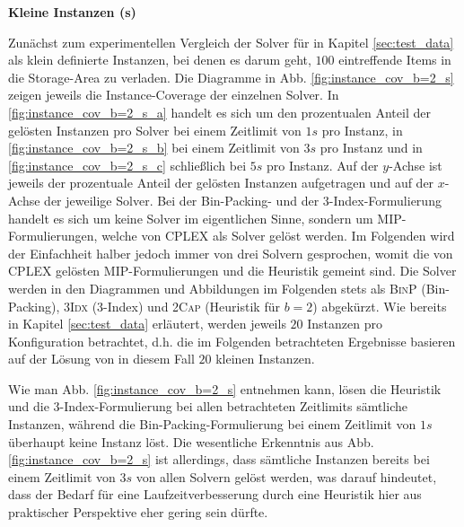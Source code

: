 \textbf{Kleine Instanzen (s)}

Zunächst zum experimentellen Vergleich der Solver für in Kapitel \ref{sec:test_data} als klein definierte Instanzen,
bei denen es darum geht, $100$ eintreffende Items in die Storage-Area zu verladen.
Die Diagramme in Abb. \ref{fig:instance_cov_b=2_s} zeigen jeweils die Instance-Coverage der einzelnen Solver.
In \ref{fig:instance_cov_b=2_s_a} handelt es sich um den prozentualen Anteil der gelösten Instanzen pro Solver bei einem Zeitlimit
von $1s$ pro Instanz, in \ref{fig:instance_cov_b=2_s_b} bei einem Zeitlimit von $3s$ pro Instanz und in \ref{fig:instance_cov_b=2_s_c}
schließlich bei $5s$ pro Instanz.\newline
Auf der $y$-Achse ist jeweils der prozentuale Anteil der gelösten Instanzen aufgetragen und auf der $x$-Achse der jeweilige Solver.
Bei der Bin-Packing- und der 3-Index-Formulierung handelt es sich um keine Solver im eigentlichen Sinne,
sondern um MIP-Formulierungen, welche von CPLEX als Solver gelöst werden.
Im Folgenden wird der Einfachheit halber jedoch immer von drei Solvern gesprochen, womit die von
CPLEX gelösten MIP-Formulierungen und die Heuristik gemeint sind.
Die Solver werden in den Diagrammen und Abbildungen im Folgenden stets als \textsc{BinP} (Bin-Packing),
\textsc{3Idx} (3-Index) und \textsc{2Cap} (Heuristik für $b = 2$) abgekürzt.
Wie bereits in Kapitel \ref{sec:test_data} erläutert, werden jeweils $20$ Instanzen pro Konfiguration betrachtet,
d.h. die im Folgenden betrachteten Ergebnisse basieren auf der Lösung von in diesem Fall $20$ kleinen Instanzen.

Wie man Abb. \ref{fig:instance_cov_b=2_s} entnehmen kann, lösen die Heuristik und die 3-Index-Formulierung bei allen betrachteten Zeitlimits sämtliche Instanzen, während die Bin-Packing-Formulierung bei einem Zeitlimit von $1s$ überhaupt keine Instanz löst.\newline
Die wesentliche Erkenntnis aus Abb. \ref{fig:instance_cov_b=2_s} ist allerdings, dass sämtliche Instanzen bereits bei einem Zeitlimit von $3s$ von allen Solvern gelöst werden, was darauf hindeutet, dass der Bedarf für eine Laufzeitverbesserung durch eine Heuristik hier
aus praktischer Perspektive eher gering sein dürfte.

